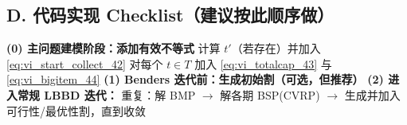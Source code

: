 \documentclass{article}
\begin{document}
\subsection{D. 代码实现 Checklist（建议按此顺序做）}

\begin{algorithm}[H]
\caption{把第4章加速策略接入 LBBD 的最小实现流程}
\DontPrintSemicolon
{}
\BlankLine
\textbf{(0) 主问题建模阶段：添加有效不等式}\;
计算 $t'$（若存在）并加入 \eqref{eq:vi_start_collect_42}\;
对每个 $t\in T$ 加入 \eqref{eq:vi_totalcap_43} 与 \eqref{eq:vi_bigitem_44}\;
\BlankLine
\textbf{(1) Benders 迭代前：生成初始割（可选，但推荐）}\;
\BlankLine
\textbf{(2) 进入常规 LBBD 迭代：}\;
重复：解 BMP $\rightarrow$ 解各期 BSP(CVRP) $\rightarrow$ 生成并加入可行性/最优性割，直到收敛\;
\end{algorithm}
\end{document}
